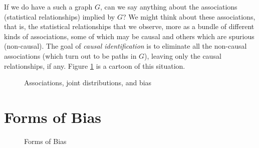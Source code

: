\documentclass[11pt, oneside]{article}   	%
\begin{document}
\bigskip
\noindent
If we do have a such a graph $G$,  can we say anything about the associations (statistical relationships) implied by $G$?
We might think about these associations, that is, the statistical relationships that we observe, more as a bundle of different kinds of associations, 
some of which may be causal and others which are spurious (non-causal). The goal of \emph{causal identification} is to 
eliminate all the non-causal associations (which turn out to  be paths in $G$), leaving only the causal relationships, if any. Figure \ref{fig:associations}
is a cartoon of this situation.


\begin{figure}[h!]
\caption{Associations, joint distributions, and bias}
\label{fig:associations}
\end{figure}


\section{Forms of Bias}

\begin{figure}
\caption{Forms of Bias}
\label{fig:forms_of_bias}
\end{figure}
\end{document}
